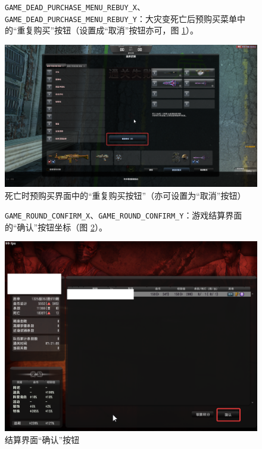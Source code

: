 \begin{figure}[H]
    \Centering
    \parbox[l]{\textwidth}{\lstinline{GAME_DEAD_PURCHASE_MENU_REBUY_X}、\lstinline{GAME_DEAD_PURCHASE_MENU_REBUY_Y}：大灾变死亡后预购买菜单中的“重复购买”按钮（设置成“取消”按钮亦可，图 \ref{ch2fig-dead-purchase-rebuy}）。}
    \includegraphics[width=\textwidth]{docs/assets/dead_purchase_rebuy.png}
    \caption{死亡时预购买界面中的“重复购买按钮”（亦可设置为“取消”按钮）}
    \label{ch2fig-dead-purchase-rebuy}
\end{figure}
\clearpage

\begin{figure}[H]
    \Centering
    \parbox[l]{\textwidth}{\lstinline{GAME_ROUND_CONFIRM_X}、\lstinline{GAME_ROUND_CONFIRM_Y}：游戏结算界面的“确认”按钮坐标（图 \ref{ch2fig-confirm-round}）。}
    \includegraphics[width=\textwidth]{docs/assets/confirm_round.png}
    \caption{结算界面“确认”按钮}
    \label{ch2fig-confirm-round}
\end{figure}
\clearpage

